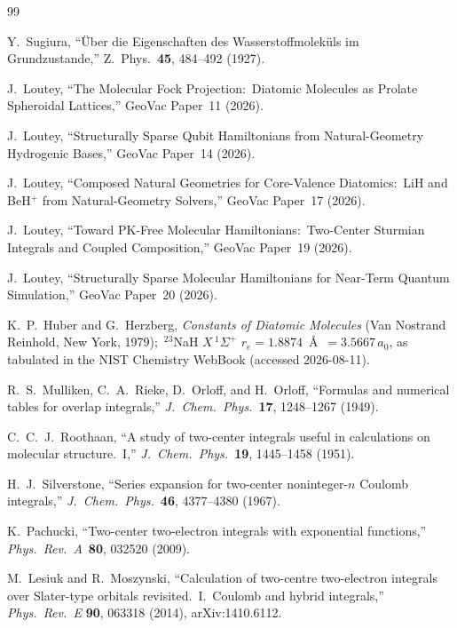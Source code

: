 \documentclass[aps,pra,twocolumn,superscriptaddress,longbibliography]{revtex4-2}
\begin{document}
\begin{thebibliography}{99}

Y.~Sugiura, ``\"Uber die Eigenschaften des Wasserstoffmolek\"uls im
Grundzustande,'' Z.~Phys.\ \textbf{45}, 484--492 (1927).

J.~Loutey, ``The Molecular Fock Projection:\ Diatomic Molecules as
Prolate Spheroidal Lattices,'' GeoVac Paper~11 (2026).

J.~Loutey, ``Structurally Sparse Qubit Hamiltonians from Natural-Geometry Hydrogenic
Bases,'' GeoVac Paper~14 (2026).

J.~Loutey, ``Composed Natural Geometries for Core-Valence Diatomics:\
LiH and BeH$^{+}$ from Natural-Geometry Solvers,'' GeoVac Paper~17 (2026).

J.~Loutey, ``Toward PK-Free Molecular Hamiltonians:\ Two-Center
Sturmian Integrals and Coupled Composition,'' GeoVac Paper~19 (2026).

J.~Loutey, ``Structurally Sparse Molecular Hamiltonians for
Near-Term Quantum Simulation,'' GeoVac Paper~20 (2026).

K.~P.~Huber and G.~Herzberg, \textit{Constants of Diatomic Molecules}
(Van Nostrand Reinhold, New York, 1979);\ $^{23}$NaH $X\,^1\Sigma^+$
$r_e = 1.8874$~\AA\ $= 3.5667\,a_0$, as tabulated in the NIST Chemistry
WebBook (accessed 2026-08-11).

R.~S.~Mulliken, C.~A.~Rieke, D.~Orloff, and H.~Orloff, ``Formulas and
numerical tables for overlap integrals,''
\textit{J.\ Chem.\ Phys.}\ \textbf{17}, 1248--1267 (1949).

C.~C.~J.~Roothaan, ``A study of two-center integrals useful in
calculations on molecular structure.\ I,''
\textit{J.\ Chem.\ Phys.}\ \textbf{19}, 1445--1458 (1951).

H.~J.~Silverstone, ``Series expansion for two-center noninteger-$n$ Coulomb integrals,''
\textit{J.\ Chem.\ Phys.}\ \textbf{46}, 4377--4380 (1967).

K.~Pachucki, ``Two-center two-electron integrals with exponential functions,''
\textit{Phys.\ Rev.\ A}\ \textbf{80}, 032520 (2009).

M.~Lesiuk and R.~Moszynski, ``Calculation of two-centre two-electron integrals
over Slater-type orbitals revisited.\ I.\ Coulomb and hybrid integrals,''
\textit{Phys.\ Rev.\ E} \textbf{90}, 063318 (2014), arXiv:1410.6112.


\end{thebibliography}
\end{document}
